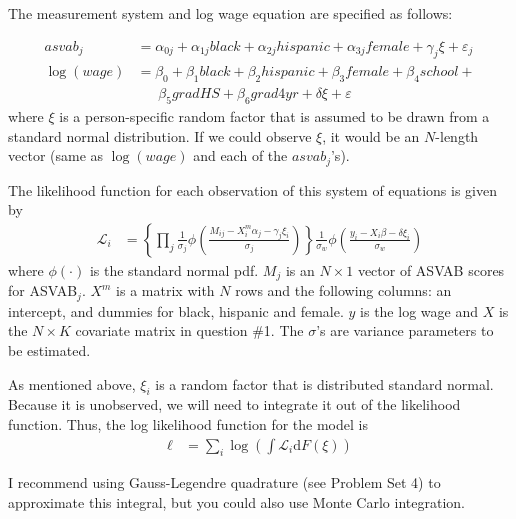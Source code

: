 \documentclass[12pt,english]{article}
\begin{document}
\begin{enumerate}
The measurement system and log wage equation are specified as follows:

\begin{align}
    asvab_j &= \alpha_{0j} + \alpha_{1j} black + \alpha_{2j} hispanic + \alpha_{3j} female + \gamma_j\xi + \varepsilon_j \\
    \log(wage) &= \beta_0 + \beta_1 black + \beta_2 hispanic + \beta_3 female + \beta_4 school + \\
    &\phantom{\text{==}}\beta_5 gradHS + \beta_6 grad4yr + \delta \xi + \varepsilon\nonumber
\end{align}
where $\xi$ is a person-specific random factor that is assumed to be drawn from a standard normal distribution. If we could observe $\xi$, it would be an $N$-length vector (same as $\log(wage)$ and each of the $asvab_j$'s).

The likelihood function for each observation of this system of equations is given by
\begin{align}
    \mathcal{L}_i &= \left\{\prod_j \frac{1}{\sigma_j}\phi\left(\frac{M_{ij} - X^m_{i}\alpha_j - \gamma_j \xi_i}{\sigma_j}\right)\right\}\frac{1}{\sigma_w}\phi\left(\frac{y_i - X_{i}\beta - \delta \xi_i}{\sigma_w}\right)
\end{align}
where $\phi\left(\cdot\right)$ is the standard normal pdf. $M_j$ is an $N\times 1$ vector of ASVAB scores for ASVAB$_j$. $X^m$ is a matrix with $N$ rows and the following columns: an intercept, and dummies for black, hispanic and female. $y$ is the log wage and $X$ is the $N\times K$ covariate matrix in question \#1. The $\sigma$'s are variance parameters to be estimated.

As mentioned above, $\xi_i$ is a random factor that is distributed standard normal. Because it is unobserved, we will need to integrate it out of the likelihood function. Thus, the log likelihood function for the model is
\begin{align}
    \ell &= \sum_i \log\left(\int \mathcal{L}_i \text{d} F\left(\xi\right)\right)
\end{align}

I recommend using Gauss-Legendre quadrature (see Problem Set 4) to approximate this integral, but you could also use Monte Carlo integration. 



\end{enumerate}
\end{document}
